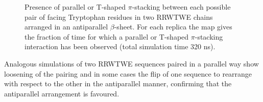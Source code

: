 \begin{figure}[p!]
\centering
{} \hspace{0.2cm}
\caption[$\pi$-stacking interaction in a RRWTWE $\beta$-sheet]{Presence of parallel or T-shaped $\pi$-stacking between each possible pair of facing Tryptophan residues in two RRWTWE chains arranged in an antiparallel $\beta$-sheet. For each replica the map gives the fraction of time for which a parallel or T-shaped $\pi$-stacking interaction has been observed (total simulation time 320 ns).}
\label{fig:hb_beta_SIhere}
\end{figure}

Analogous simulations of two RRWTWE sequences paired in a parallel way show loosening of the pairing and in some cases the flip of one sequence to rearrange with respect to the other in the antiparallel manner, confirming that the antiparallel arrangement is favoured.

